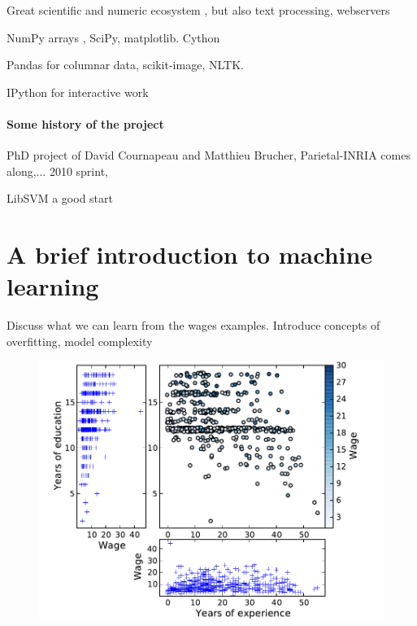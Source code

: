 \documentclass[a4paper]{article}
\begin{document}
Great scientific and numeric ecosystem
\cite{oliphant2007python,varoquaux2013scipy}, but also text processing,
webservers

NumPy arrays \cite{vanderwalt2011}, SciPy, matplotlib. Cython
\cite{behnel2011cython}

Pandas for columnar data, scikit-image, NLTK.

IPython for interactive work \cite{perez2007ipython}

\paragraph{Some history of the project}
%
PhD project of David Cournapeau and Matthieu Brucher, Parietal-INRIA
comes along,... 2010 sprint, 

LibSVM a good start
\cite{chang2011libsvm}

\section{A brief introduction to machine learning}

Discuss what we can learn from the wages examples. Introduce concepts of
overfitting, model complexity

\begin{figure}
    \hspace*{-.015\linewidth}%
    \includegraphics[width=1.05\linewidth]{wage_data}%
\end{figure}
\end{document}

